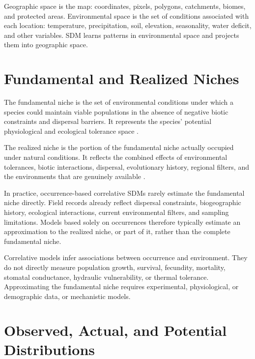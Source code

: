 \begin{conceito}
Geographic space is the map: coordinates, pixels, polygons, catchments, biomes,
and protected areas. Environmental space is the set of conditions associated
with each location: temperature, precipitation, soil, elevation, seasonality,
water deficit, and other variables. SDM learns patterns in environmental space
and projects them into geographic space.
\end{conceito}

\section{Fundamental and Realized Niches}

The fundamental niche is the set of environmental conditions under which a
species could maintain viable populations in the absence of negative biotic
constraints and dispersal barriers. It represents the species' potential
physiological and ecological tolerance space
\parencite{hutchinson1957,pulliam2000,soberon2005}.

The realized niche is the portion of the fundamental niche actually occupied
under natural conditions. It reflects the combined effects of environmental
tolerances, biotic interactions, dispersal, evolutionary history, regional
filters, and the environments that are genuinely available
\parencite{pulliam2000,soberon2009}.

In practice, occurrence-based correlative SDMs rarely estimate the fundamental
niche directly. Field records already reflect dispersal constraints,
biogeographic history, ecological interactions, current environmental filters,
and sampling limitations. Models based solely on occurrences therefore
typically estimate an approximation to the realized niche, or part of it,
rather than the complete fundamental niche.

\begin{atencao}
Correlative models infer associations between occurrence and environment. They
do not directly measure population growth, survival, fecundity, mortality,
stomatal conductance, hydraulic vulnerability, or thermal tolerance.
Approximating the fundamental niche requires experimental, physiological, or
demographic data, or mechanistic models.
\end{atencao}

\section{Observed, Actual, and Potential Distributions}

